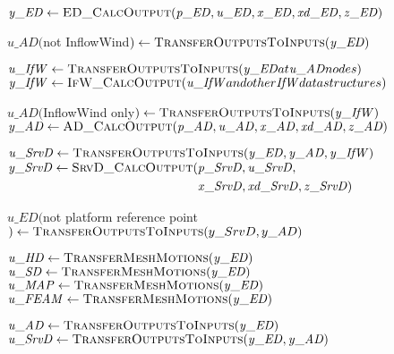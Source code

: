 \documentclass[10pt,letterpaper,oneside,notitlepage]{article}
\begin{document}
\begin{algorithmic}[1]
\State $\mathit{y\_ED} \gets \Call{ED\_CalcOutput}{\mathit{p\_ED},\mathit{u\_ED},\mathit{x\_ED},\mathit{xd\_ED},\mathit{z\_ED}}$

\State
	\State $\mathit{u\_AD}($not InflowWind$)  \gets \Call{TransferOutputsToInputs}{\mathit{y\_ED}}$
	
	\State $\mathit{u\_IfW} \gets \Call{TransferOutputsToInputs}{\mathit{y\_ED} at \mathit{u\_AD} nodes}$
	\State $\mathit{y\_IfW} \gets \Call{IfW\_CalcOutput}{\mathit{u\_IfW} and other \mathit{IfW} data structures}$
	
	\State $\mathit{u\_AD}($InflowWind only$) \gets \Call{TransferOutputsToInputs}{\mathit{y\_IfW}}$
	\State $\mathit{y\_AD} \gets \Call{AD\_CalcOutput}{\mathit{p\_AD},\mathit{u\_AD},\mathit{x\_AD},\mathit{xd\_AD},\mathit{z\_AD}}$

\State
	\State $\mathit{u\_SrvD} \gets \Call{TransferOutputsToInputs}{\mathit{y\_ED},\mathit{y\_AD},\mathit{y\_IfW}}$
	\State $\mathit{y\_SrvD} \gets \Call{SrvD\_CalcOutput}{}( \!
				\begin{aligned}[t]
				                      & \mathit{p\_SrvD},\mathit{u\_SrvD}, \\
	                            & \mathit{x\_SrvD},\mathit{xd\_SrvD},\mathit{z\_SrvD}) \\
				\end{aligned}$

\State
	\State $\mathit{u\_ED}($not platform reference point$) \gets \Call{TransferOutputsToInputs}{y\_SrvD,y\_AD}$ %

	\State $\mathit{u\_HD}   \gets \Call{TransferMeshMotions}{\mathit{y\_ED}}$
	\State $\mathit{u\_SD}   \gets \Call{TransferMeshMotions}{\mathit{y\_ED}}$
	\State $\mathit{u\_MAP}  \gets \Call{TransferMeshMotions}{\mathit{y\_ED}}$
	\State $\mathit{u\_FEAM} \gets \Call{TransferMeshMotions}{\mathit{y\_ED}}$

\State
\State {}
\State
\State $\mathit{u\_AD} \gets \Call{TransferOutputsToInputs}{\mathit{y\_ED}}$
\State $\mathit{u\_SrvD} \gets \Call{TransferOutputsToInputs}{\mathit{y\_ED},\mathit{y\_AD}}$

\EndProcedure
\end{algorithmic}
\end{document}
